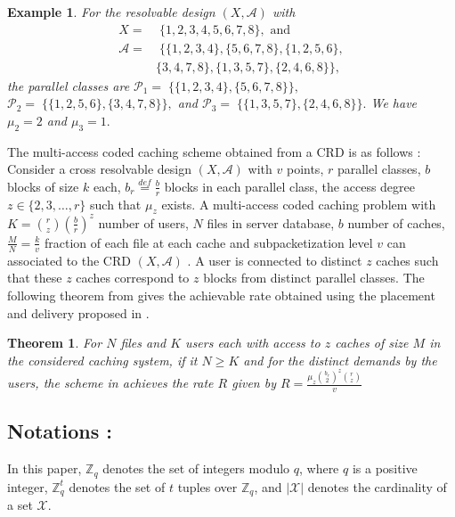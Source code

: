 \documentclass[conference]{IEEEtran}
\newtheorem{thm}{Theorem}
\newtheorem{exmp}{Example}
\begin{document}
\begin{exmp}
		\label{exmp4}
		For the resolvable design $(X, \mathcal{A})$ with 
		\begin{align*}
		X =&\; \{1, 2, 3, 4, 5, 6, 7, 8\}, \text{ and} \\
		\mathcal{A} =&\; \{\{1, 2, 3, 4\},\{ 5, 6, 7, 8\},\{1, 2, 5, 6\},\\
		&\{3, 4, 7, 8\},\{1, 3, 5, 7\},\{2, 4, 6, 8\}\},
		\end{align*}
		the parallel classes are 
		$\mathcal{P}_1 =\; \{\{1, 2, 3, 4\},\{5, 6, 7, 8\}\},$ 
		$\mathcal{P}_2 =\; \{\{1, 2, 5, 6\},\{3, 4, 7, 8\}\},$  and 
		$\mathcal{P}_3 =\; \{\{1, 3, 5, 7\},\{2, 4, 6, 8\}\}.$
		We have $\mu_2=2$ and $\mu_3=1.$
\end{exmp}	
The multi-access coded caching scheme obtained from a CRD is as follows \cite{KNRarXiv}:  Consider a cross resolvable design $(X, \mathcal{A})$ with $v$ points, $r$ parallel classes, $b$ blocks of size $k$ each, $b_r\stackrel{def}{=}\frac{b}{r}$ blocks in each parallel class, the access degree $z \in \{2,3,\dots,r\}$ such that $\mu_{z}$ exists. A multi-access coded caching problem with $K = {r \choose z} (\frac{b}{r})^z$ number of users, $N$ files in server database, $b$  number of caches, $\frac{M}{N} = \frac{k}{v}$ fraction of each file at each cache and subpacketization level $v$ can associated to the CRD  $(X, \mathcal{A})$ \cite{KNRarXiv}. A user is connected to distinct $z$ caches such that these $z$ caches correspond to $z$ blocks from distinct parallel classes. The following theorem from \cite{KNRarXiv} gives the achievable rate obtained using the placement and delivery proposed in \cite{KNRarXiv}.
\begin{thm} \cite{KNRarXiv}
		\label{knrmathm}
		For $N$ files and $K$ users each with access to $z$
		caches of size $M$ in the considered caching system, if it $N \geq K$ and for the distinct demands by the users, the  scheme in \cite{KNRarXiv} achieves the rate $R$ given by
		$R = \frac{{\mu}_z {{b_r}\choose{2}}^z {{r}\choose{z}}}{v}$
	\end{thm}
\subsection*{Notations : }
	In this paper, $\mathbb{Z}_q$ denotes the set of integers modulo $q$, where $q$ is a positive integer, $\mathbb{Z}_q^t$ denotes the set of $t$ tuples over $\mathbb{Z}_q$, and $|\mathcal{X}|$ denotes the cardinality of a set $\mathcal{X}$.
\end{document}
